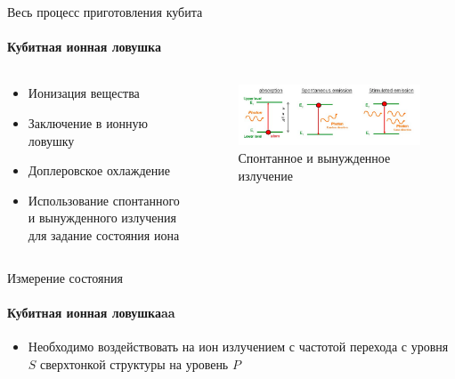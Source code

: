 \documentclass{beamer}
\begin{document}
    \begin{frame}{Весь процесс приготовления кубита}
    \framesubtitle{Кубитная ионная ловушка}

    \begin{columns}

    \begin{column}{0.5\textwidth}

        \begin{itemize}
                \item Ионизация вещества
                \item Заключение в ионную ловушку
                \item Доплеровское охлаждение
                \item Использование спонтанного и вынужденного излучения для
                      задание состояния иона
        \end{itemize}

    \end{column}

    \begin{column}{0.5\textwidth}

        \begin{figure}
            \centering
            \includegraphics[width=\textwidth]{media/emission-comparison.png}
            \caption{Спонтанное и вынужденное излучение}
        \end{figure}

    \end{column}

    \end{columns}


    \end{frame}


    \begin{frame}{Измерение состояния}
    \framesubtitle{Кубитная ионная ловушкаaa}

        \begin{itemize}

                \item Необходимо воздействовать на ион излучением с частотой перехода с уровня $S$ сверхтонкой структуры на уровень $P$



        \end{itemize}

    \end{frame}
\end{document}
